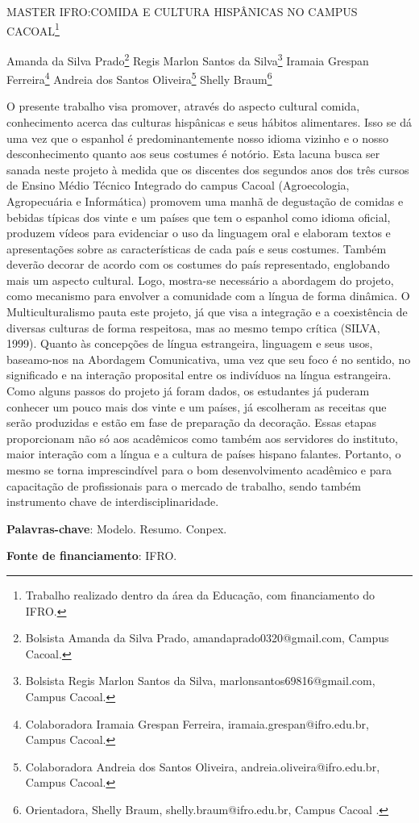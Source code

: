 \documentclass[article,12pt,onesidea,4paper,english,brazil]{abntex2}
\begin{document}
	
	
	\frenchspacing 
	
	\begin{center}
		\LARGE MASTER IFRO:COMIDA E CULTURA HISPÂNICAS NO CAMPUS CACOAL\footnote{Trabalho realizado dentro da área da Educação, com financiamento do IFRO.}
		
		\normalsize
		Amanda da Silva Prado\footnote{Bolsista Amanda da Silva Prado, amandaprado0320@gmail.com, Campus Cacoal.} 
	Regis Marlon Santos da Silva\footnote{Bolsista Regis Marlon Santos da Silva, marlonsantos69816@gmail.com, Campus Cacoal.} 
	Iramaia Grespan Ferreira\footnote{Colaboradora Iramaia Grespan Ferreira, iramaia.grespan@ifro.edu.br, Campus Cacoal.} 
	Andreia dos Santos Oliveira\footnote{Colaboradora Andreia dos Santos Oliveira, andreia.oliveira@ifro.edu.br, Campus Cacoal.} 
	Shelly Braum\footnote{Orientadora, Shelly Braum, shelly.braum@ifro.edu.br, Campus Cacoal .} 
	\end{center}
	
	\noindent O presente trabalho visa promover, através do aspecto cultural comida, conhecimento acerca das
	culturas hispânicas e seus hábitos alimentares. Isso se dá uma vez que o espanhol é
	predominantemente nosso idioma vizinho e o nosso desconhecimento quanto aos seus costumes é
	notório. Esta lacuna busca ser sanada neste projeto à medida que os discentes dos segundos anos
	dos três cursos de Ensino Médio Técnico Integrado do campus Cacoal (Agroecologia, Agropecuária e
	Informática) promovem uma manhã de degustação de comidas e bebidas típicas dos vinte e um
	países que tem o espanhol como idioma oficial, produzem vídeos para evidenciar o uso da linguagem
	oral e elaboram textos e apresentações sobre as características de cada país e seus costumes.
	Também deverão decorar de acordo com os costumes do país representado, englobando mais um
	aspecto cultural. Logo, mostra-se necessário a abordagem do projeto, como mecanismo para
	envolver a comunidade com a língua de forma dinâmica. O Multiculturalismo pauta este projeto, já
	que visa a integração e a coexistência de diversas culturas de forma respeitosa, mas ao mesmo
	tempo crítica (SILVA, 1999). Quanto às concepções de língua estrangeira, linguagem e seus usos,
	baseamo-nos na Abordagem Comunicativa, uma vez que seu foco é no sentido, no significado e na
	interação proposital entre os indivíduos na língua estrangeira. Como alguns passos do projeto já
	foram dados, os estudantes já puderam conhecer um pouco mais dos vinte e um países, já
	escolheram as receitas que serão produzidas e estão em fase de preparação da decoração. Essas
	etapas proporcionam não só aos acadêmicos como também aos servidores do instituto, maior
	interação com a língua e a cultura de países hispano falantes. Portanto, o mesmo se torna
	imprescindível para o bom desenvolvimento acadêmico e para capacitação de profissionais para o
	mercado de trabalho, sendo também instrumento chave de interdisciplinaridade.
	
	\vspace{\onelineskip}
	
	\noindent
	\textbf{Palavras-chave}: Modelo. Resumo. Conpex.
	
		\vspace{\onelineskip}
	
	\noindent
	\textbf{Fonte de financiamento}: IFRO.
	
\end{document}
